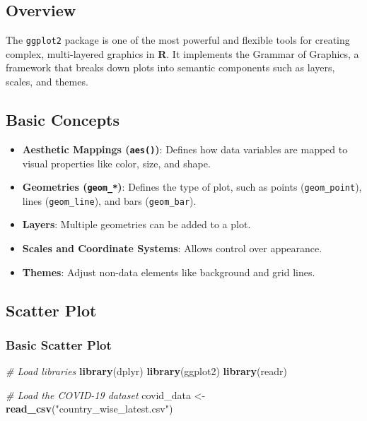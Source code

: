 \documentclass[
]{book}
\newenvironment{Shaded}{\begin{snugshade}}{\end{snugshade}}
\newcommand{\CommentTok}[1]{\textcolor[rgb]{0.56,0.35,0.01}{\textit{#1}}}
\newcommand{\FunctionTok}[1]{\textcolor[rgb]{0.13,0.29,0.53}{\textbf{#1}}}
\newcommand{\NormalTok}[1]{#1}
\newcommand{\OtherTok}[1]{\textcolor[rgb]{0.56,0.35,0.01}{#1}}
\newcommand{\StringTok}[1]{\textcolor[rgb]{0.31,0.60,0.02}{#1}}
\providecommand{\tightlist}{%
  \setlength{\itemsep}{0pt}\setlength{\parskip}{0pt}}
\begin{document}
\subsection{Overview}\label{overview}

The \texttt{ggplot2} package is one of the most powerful and flexible tools for creating complex, multi-layered graphics in \textbf{R}. It implements the Grammar of Graphics, a framework that breaks down plots into semantic components such as layers, scales, and themes.

\subsection{Basic Concepts}\label{basic-concepts}

\begin{itemize}
\tightlist
\item
  \textbf{Aesthetic Mappings (\texttt{aes()})}: Defines how data variables are mapped to visual properties like color, size, and shape.
\item
  \textbf{Geometries (\texttt{geom\_*})}: Defines the type of plot, such as points (\texttt{geom\_point}), lines (\texttt{geom\_line}), and bars (\texttt{geom\_bar}).
\item
  \textbf{Layers}: Multiple geometries can be added to a plot.
\item
  \textbf{Scales and Coordinate Systems}: Allows control over appearance.
\item
  \textbf{Themes}: Adjust non-data elements like background and grid lines.
\end{itemize}

\subsection{Scatter Plot}\label{scatter-plot}

\subsubsection{Basic Scatter Plot}\label{basic-scatter-plot}

\begin{Shaded}
\begin{Highlighting}[]
\CommentTok{\# Load libraries}
\FunctionTok{library}\NormalTok{(dplyr)}
\FunctionTok{library}\NormalTok{(ggplot2)}
\FunctionTok{library}\NormalTok{(readr)}

\CommentTok{\# Load the COVID{-}19 dataset}
\NormalTok{covid\_data }\OtherTok{\textless{}{-}} \FunctionTok{read\_csv}\NormalTok{(}\StringTok{"country\_wise\_latest.csv"}\NormalTok{)}
\end{Highlighting}
\end{Shaded}
\end{document}
